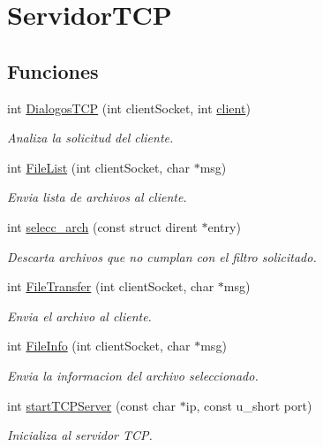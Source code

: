 \hypertarget{group__ServidorTCP}{
\section{ServidorTCP}
\label{group__ServidorTCP}
}
\subsection*{Funciones}
\begin{DoxyCompactItemize}
\item 
int \hyperlink{group__ServidorTCP_gaf7a41b28b4112b5ba274364a03bb05e8}{DialogosTCP} (int clientSocket, int \hyperlink{TCPServer_8c_a4bf947cca001e8ca0cd9def2b8d058c7}{client})
\begin{DoxyCompactList}\small\item\em Analiza la solicitud del cliente. \end{DoxyCompactList}\item 
int \hyperlink{group__ServidorTCP_ga4c824f1f3f4b874a325f4d333402f114}{FileList} (int clientSocket, char $\ast$msg)
\begin{DoxyCompactList}\small\item\em Envia lista de archivos al cliente. \end{DoxyCompactList}\item 
int \hyperlink{group__ServidorTCP_ga4b0291c26c5216ef5f6417abfb76f59b}{selecc\_\-arch} (const struct dirent $\ast$entry)
\begin{DoxyCompactList}\small\item\em Descarta archivos que no cumplan con el filtro solicitado. \end{DoxyCompactList}\item 
int \hyperlink{group__ServidorTCP_gafd8c9cb8cbdf6c5017849bdf4aec3c5c}{FileTransfer} (int clientSocket, char $\ast$msg)
\begin{DoxyCompactList}\small\item\em Envia el archivo al cliente. \end{DoxyCompactList}\item 
int \hyperlink{group__ServidorTCP_gabe2cfb9e0f85f447660b1d1e74137e91}{FileInfo} (int clientSocket, char $\ast$msg)
\begin{DoxyCompactList}\small\item\em Envia la informacion del archivo seleccionado. \end{DoxyCompactList}\item 
int \hyperlink{group__ServidorTCP_ga6a66838c58b5b5a617bb111891be1f40}{startTCPServer} (const char $\ast$ip, const u\_\-short port)
\begin{DoxyCompactList}\small\item\em Inicializa al servidor TCP. \end{DoxyCompactList}\end{DoxyCompactItemize}


